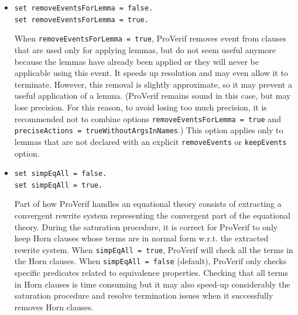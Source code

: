 \documentclass{book}
\begin{document}
\begin{itemize}
This replacement is done when \lstinline{redundantHypElim} is set to
\lstinline{true}, or when it is set to \lstinline{beginOnly} and
$H$ contains a \lstinline{begin} fact (which is generated
when events occur after \lstinline{==>} in a query) or a blocking fact.
Indeed, testing this property takes time, and slows down
small examples. On the other hand, on big examples, in particular
when they contain many events (or blocking facts),
this technique can yield huge speedups.


\item \lstinline{set removeEventsForLemma = false.}\\
      \lstinline{set removeEventsForLemma = true.}

When \lstinline{removeEventsForLemma = true}, ProVerif
removes event from clauses that are used only for applying
lemmas, but do not seem useful anymore because the lemmas
have already been applied or they will never be applicable
using this event.
It speeds up resolution and may even allow it to terminate.
However, this removal is slightly approximate, so it may
prevent a useful application of a lemma. (ProVerif
remains sound in this case, but may lose precision.
For this reason, to avoid losing too much precision,
it is recommended not to
combine options \lstinline{removeEventsForLemma = true}
and \lstinline{preciseActions = trueWithoutArgsInNames}.)
This option applies only to lemmas that are not declared with
an explicit \lstinline!removeEvents! or \lstinline!keepEvents! option.

\item \lstinline{set simpEqAll = false.}\\
\lstinline{set simpEqAll = true.}

Part of how ProVerif handles an equational theory consists of extracting a convergent rewrite system representing the convergent part of the equational theory. During the saturation procedure, it is correct for ProVerif to only keep Horn clauses whose terms are in normal form w.r.t. the extracted rewrite system. When \lstinline{simpEqAll = true}, ProVerif will check all the terms in the Horn clauses. When \lstinline{simpEqAll = false} (default), ProVerif only checks specific predicates related to equivalence properties. 
	Checking that all terms in Horn clauses is time consuming but it may also speed-up considerably the saturation procedure and resolve termination issues when it successfully removes Horn clauses.


\end{itemize}
\end{document}
